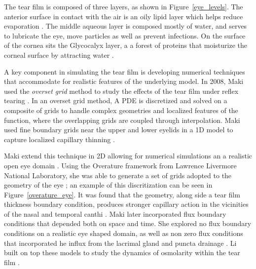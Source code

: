 	The tear film is composed of three layers, as shown in Figure~\ref{eye_levels}. The anterior surface in contact with the air is an oily lipid layer which helps reduce evaporation \cite{norn1979semiquantitative,mishima1961oily}. The middle aqueous layer is composed mostly of water, and serves to lubricate the eye, move particles as well as prevent infections. On the surface of the cornea sits the Glycocalyx layer, a a forest of proteins that moisturize the corneal surface by attracting water \cite{gipson2004distribution}. 
	
	A key component in simulating the tear film is developing numerical techniques that accommodate for realistic features of the underlying model. In 2008, Maki used the \textit{overset grid} method to study the effects of the tear film under reflex tearing \cite{maki2008overset}. In an overset grid method, A PDE is discretized and solved on a composite of grids to handle complex geometries and localized features of the function, where the overlapping grids are coupled through interpolation. Maki used fine boundary grids near the upper and lower eyelids in a 1D model to capture localized capillary thinning \cite{maki2008overset}.
	
	Maki extend this technique in 2D allowing for numerical simulations an a realistic open eye domain \cite{maki2010tear,maki2010tear2}. Using the Overature framework from Lawrence Livermore National Laboratory, she was able to generate a set of grids adopted to the geometry of the eye \cite{chesshire1990composite}; an example of this discritization can be seen in Figure~\ref{overature_eye}. It was found that the geometry, along side a tear film thickness boundary condition, produces stronger capillary action in the vicinities of the nasal and temporal canthi \cite{maki2010tear}. Maki later incorporated flux boundary conditions that depended both on space and time. She explored no flux boundary conditions on a realistic eye shaped domain, as well as non zero flux conditions that incorporated he influx from the lacrimal gland and puncta drainage \cite{maki2010tear2}. Li built on top these models to study the dynamics of osmolarity within the tear film \cite{li2012model,li2015computed}.
	
